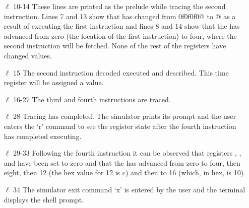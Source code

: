 \begin{itemize}
\item [$\ell$ 10-14] These lines are printed as the prelude while tracing the
	second instruction. Lines 7 and 13 show that  has changed
	from \verb@f0f0f0f0@ to @ as a result of executing the
	first instruction and lines 8 and 14 show that the  has 
	advanced from zero (the location of the first instruction) to 
	four, where the second instruction will be fetched.  None of the
	rest of the registers have changed values.
\item [$\ell$ 15] The second instruction decoded executed and described.  
	This time register  will be assigned a value.
\item [$\ell$ 16-27] The third and fourth instructions are traced.
\item [$\ell$ 28] Tracing has completed. The simulator prints its prompt
	and the user enters the `r' command to see the register state
	after the fourth instruction has completed executing.
\item [$\ell$ 29-33] Following the fourth instruction it can be observed
	that registers , ,  and  
	have been set to zero and that the  has advanced from
	zero to four, then eight, then 12 (the hex value for 12 is c)
	and then to 16 (which, in hex, is 10). 
\item [$\ell$ 34] The simulator exit command `x' is entered by the user and
	the terminal displays the shell prompt.

\end{itemize}
